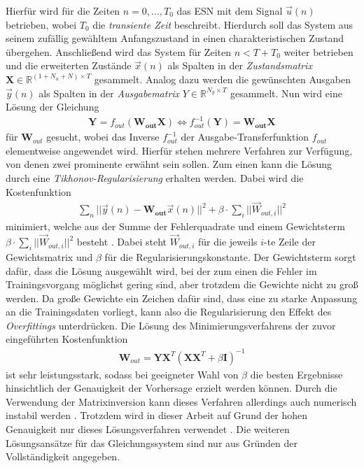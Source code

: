 Hierfür wird für die Zeiten $n=0, ..., T_0$ das \textsc{ESN} mit dem Signal $\vec{u}(n)$ betrieben, wobei $T_0$ die \textit{transiente Zeit} beschreibt. Hierdurch soll das System aus seinem zufällig gewähltem Anfangszustand in einen charakteristischen Zustand übergehen. Anschließend wird das System für Zeiten $n < T + T_0$ weiter betrieben und die erweiterten Zustände $\vec{x}(n)$ als Spalten in der \textit{Zustandsmatrix} $\mathbf{X} \in \mathbb{R}^{(1 + N_u + N) \times T}$ gesammelt. Analog dazu werden die gewünschten Ausgaben $\vec{y}(n)$ als Spalten in der \textit{Ausgabematrix} $Y \in \mathbb{R}^{N_y \times T}$ gesammelt.
Nun wird eine Lösung der Gleichung
\begin{align}
\mathbf{Y} = f_{out} \left( \mathbf{W_{out}} \mathbf{X} \right) \Leftrightarrow f_{out}^{-1} \left( \mathbf{Y} \right) = \mathbf{W_{out}}\mathbf{X}
\end{align}
für $\mathbf{W}_{out}$ gesucht, wobei das Inverse $f^{-1}_{out}$ der Ausgabe-Transferfunktion $f_{out}$ elementweise angewendet wird. Hierfür stehen mehrere Verfahren zur Verfügung, von denen zwei prominente erwähnt sein sollen.
Zum einen kann die Lösung durch eine \textit{Tikhonov-Regularisierung} erhalten werden. Dabei wird die Kostenfunktion 
\begin{align}
\sum_n ||\vec{y}(n) - \mathbf{W_{out}}\vec{x}(n)||^2 + \beta \cdot \sum_i ||\vec{W}_{out, i}||^2
\end{align}
minimiert, welche aus der Summe der Fehlerquadrate und einem Gewichtsterm $\beta \cdot \sum_i ||\vec{W}_{out, i}||^2$ besteht \citep{lukovsevivcius2012practical}. Dabei steht $\vec{W}_{out, i}$ für die jeweils $i$-te Zeile der Gewichtsmatrix und $\beta$ für die Regularisierungskonstante. Der Gewichtsterm sorgt dafür, dass die Lösung ausgewählt wird, bei der zum einen die Fehler im Trainingsvorgang möglichst gering sind, aber trotzdem die Gewichte nicht zu groß werden. Da große Gewichte ein Zeichen dafür sind, dass eine zu starke Anpassung an die Trainingsdaten vorliegt, kann also die Regularisierung den Effekt des \textit{Overfittings} unterdrücken. Die Lösung des Minimierungsverfahrens der zuvor eingeführten Kostenfunktion
\begin{align}
\label{eq:tikhonov}
\mathbf{W}_{out} = \mathbf{Y} \mathbf{X}^T \left(\mathbf{X} \mathbf{X}^T + \beta \mathbf{I} \right)^{-1}
\end{align}
ist sehr leistungsstark, sodass bei geeigneter Wahl von $\beta$ die besten Ergebnisse hinsichtlich der Genauigkeit der Vorhersage erzielt werden können. Durch die Verwendung der Matrixinversion kann dieses Verfahren allerdings auch numerisch instabil werden \cite{lukoseviciusa2009}. Trotzdem wird in dieser Arbeit auf Grund der hohen Genauigkeit nur dieses Lösungsverfahren verwendet \citep{lukovsevivcius2012practical}. Die weiteren Lösungsansätze für das Gleichungssystem sind nur aus Gründen der Vollständigkeit angegeben.\\

